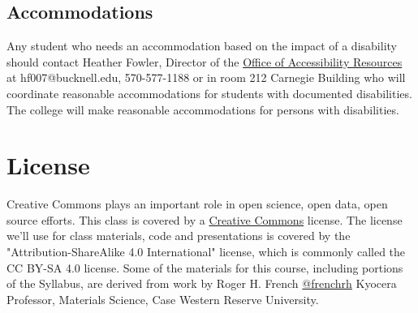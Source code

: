 \documentclass[11pt]{article} %
\begin{document}
  \subsection{Accommodations}
  
  Any student who needs an accommodation based on the impact of a disability should contact Heather Fowler, Director of the \href{https://www.bucknell.edu/about-bucknell/accessibility-resources/services-and-resources-for-students/academic-accommodations}{Office of Accessibility Resources} at hf007@bucknell.edu, 570-577-1188 or in room 212 Carnegie Building who will coordinate reasonable accommodations for students with documented disabilities. The college will make reasonable accommodations for persons with disabilities. 


\section{License}
  
    Creative Commons plays an important role in open science, open data, open source efforts. This class is covered by a \href{"http://creativecommons.org/licenses/"}{Creative Commons} license. The license we'll use for class materials, code and presentations is covered by  the "Attribution-ShareAlike 4.0 International" license, which is commonly called the CC BY-SA 4.0 license. Some of the materials for this course, including portions of the Syllabus, are derived from work by Roger H. French \href{"https://twitter.com/frenchrh"}{@frenchrh} Kyocera Professor, Materials Science, Case Western Reserve University.

\end{document}
